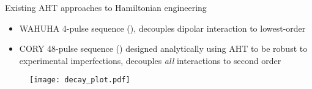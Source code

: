 \documentclass{beamer}
\begin{document}
\begin{frame}{Existing AHT approaches to Hamiltonian engineering}

\begin{itemize}
    \item WAHUHA 4-pulse sequence (\cite{PhysRevLett.20.180}), decouples dipolar interaction to lowest-order

    \item CORY 48-pulse sequence (\cite{CORY1990205}) designed analytically using AHT to be robust to experimental imperfections, decouples \emph{all} interactions to second order
\end{itemize}

\begin{figure}
\centering
\texttt{[image: decay\_plot.pdf]}
\end{figure}


\end{frame}
\end{document}
